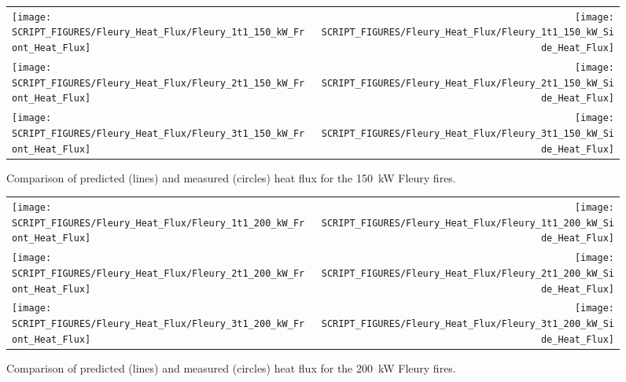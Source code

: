 \newpage

\begin{figure}[p]
\begin{tabular*}{\textwidth}{l@{\extracolsep{\fill}}r}
\texttt{[image: SCRIPT\_FIGURES/Fleury\_Heat\_Flux/Fleury\_1t1\_150\_kW\_Front\_Heat\_Flux]} &
\texttt{[image: SCRIPT\_FIGURES/Fleury\_Heat\_Flux/Fleury\_1t1\_150\_kW\_Side\_Heat\_Flux]} \\
\texttt{[image: SCRIPT\_FIGURES/Fleury\_Heat\_Flux/Fleury\_2t1\_150\_kW\_Front\_Heat\_Flux]} &
\texttt{[image: SCRIPT\_FIGURES/Fleury\_Heat\_Flux/Fleury\_2t1\_150\_kW\_Side\_Heat\_Flux]} \\
\texttt{[image: SCRIPT\_FIGURES/Fleury\_Heat\_Flux/Fleury\_3t1\_150\_kW\_Front\_Heat\_Flux]} &
\texttt{[image: SCRIPT\_FIGURES/Fleury\_Heat\_Flux/Fleury\_3t1\_150\_kW\_Side\_Heat\_Flux]}
\end{tabular*}
\label{Fleury_Heat_Flux_150_kW}
\caption[Fleury Heat Flux, 150 kW fires.]
{Comparison of predicted (lines) and measured (circles) heat flux for the 150~kW Fleury fires.}
\end{figure}

\begin{figure}[p]
\begin{tabular*}{\textwidth}{l@{\extracolsep{\fill}}r}
\texttt{[image: SCRIPT\_FIGURES/Fleury\_Heat\_Flux/Fleury\_1t1\_200\_kW\_Front\_Heat\_Flux]} &
\texttt{[image: SCRIPT\_FIGURES/Fleury\_Heat\_Flux/Fleury\_1t1\_200\_kW\_Side\_Heat\_Flux]} \\
\texttt{[image: SCRIPT\_FIGURES/Fleury\_Heat\_Flux/Fleury\_2t1\_200\_kW\_Front\_Heat\_Flux]} &
\texttt{[image: SCRIPT\_FIGURES/Fleury\_Heat\_Flux/Fleury\_2t1\_200\_kW\_Side\_Heat\_Flux]} \\
\texttt{[image: SCRIPT\_FIGURES/Fleury\_Heat\_Flux/Fleury\_3t1\_200\_kW\_Front\_Heat\_Flux]} &
\texttt{[image: SCRIPT\_FIGURES/Fleury\_Heat\_Flux/Fleury\_3t1\_200\_kW\_Side\_Heat\_Flux]}
\end{tabular*}
\label{Fleury_Heat_Flux_200_kW}
\caption[Fleury Heat Flux, 200 kW fires.]
{Comparison of predicted (lines) and measured (circles) heat flux for the 200~kW Fleury fires.}
\end{figure}

